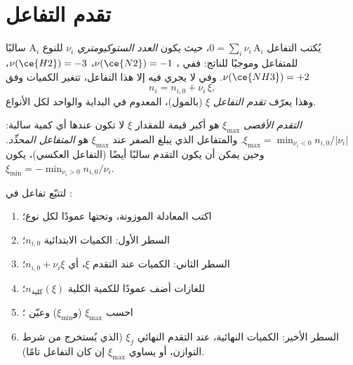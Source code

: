 \section{تقدم التفاعل}

\begin{definition}\label{def:b1:extent-q-and-k:extent}
يُكتب التفاعل $0 = \sum_i \nu_i\,\mathrm{A}_i$، حيث يكون
\emph{العدد الستوكيومتري} $\nu_i$
للنوع $\mathrm{A}_i$ سالبًا للمتفاعل وموجبًا
للناتج: ففي ، $\nu(\ce{N2}) = -1$، $\nu(\ce{H2}) = -3$،
$\nu(\ce{NH3}) = +2$. وفي  لا يجري فيه إلا هذا التفاعل،
تتغير الكميات وفق
\[
  n_i = n_{i,0} + \nu_i\,\xi ,
\]
وهذا يعرّف \emph{تقدم التفاعل}
$\xi$ (بالمول)، المعدوم في البداية والواحد لكل الأنواع.
\end{definition}

\begin{definition}\label{def:b1:extent-q-and-k:max-extent}
\emph{التقدم الأقصى} $\xi_{\max}$ هو أكبر
قيمة للمقدار $\xi$ لا تكون عندها أي كمية سالبة: $\xi_{\max} = \min_{\nu_i <
0} n_{i,0}/|\nu_i|$. والمتفاعل الذي يبلغ الصفر عند $\xi_{\max}$ هو
\emph{المتفاعل المحدِّد}. وحين يمكن أن يكون
التقدم سالبًا أيضًا (التفاعل العكسي)، يكون $\xi_{\min} = -\min_{\nu_i > 0}
n_{i,0}/\nu_i$.
\end{definition}

\begin{method}\label{met:b1:extent-q-and-k:progress-table}
لتتبّع تفاعل في :
\begin{enumerate}
  \item اكتب المعادلة الموزونة، وتحتها عمودًا لكل نوع؛
  \item السطر الأول: الكميات الابتدائية $n_{i,0}$؛
  \item السطر الثاني: الكميات عند التقدم $\xi$، أي $n_{i,0} + \nu_i\xi$؛
  \item للغازات أضف عمودًا للكمية الكلية $n_{\text{كلية}}(\xi)$؛
  \item احسب $\xi_{\max}$ (و$\xi_{\min}$) وعيّن ؛
  \item السطر الأخير: الكميات النهائية، عند التقدم النهائي $\xi_f$ (الذي
        يُستخرج من شرط التوازن، أو يساوي $\xi_{\max}$ إن كان
        التفاعل تامًا).
\end{enumerate}
\end{method}


